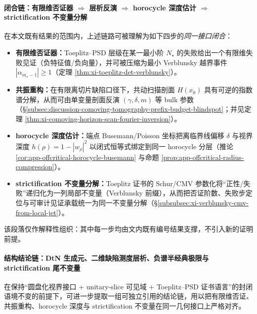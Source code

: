 \paragraph{闭合链：有限维否证器 \texorpdfstring{$\Rightarrow$}{=>} 层析反演 \texorpdfstring{$\Rightarrow$}{=>} horocycle 深度估计 \texorpdfstring{$\Rightarrow$}{=>} strictification 不变量分解}
在本文既有结果的范围内，上述链路可被理解为如下四步的\emph{同一接口闭合}：
\begin{itemize}
  \item \textbf{有限维否证器：}Toeplitz--PSD 层级在某一最小阶 \(N_\star\) 的失败给出一个有限维失败见证（负特征值/负向量），并可被压缩为最小 Verblunsky 越界事件 \(|\alpha_{m_\star-1}|\ge 1\)（定理 \ref{thm:xi-toeplitz-det-verblunsky}）。
  \item \textbf{共振重构：}在有限离切片缺陷口径下，共动扫描剖面 \(H(x_0)\) 具有可逆的指数谱分解，从而可由单变量剖面反演 \((\gamma,\delta,m)\) 等 bulk 参数（\S\ref{subsec:discussion-comoving-tomography-prefix-budget-blindspot}；并见定理 \ref{thm:xi-comoving-horizon-scan-fourier-inversion}）。
  \item \textbf{horocycle 深度估计：}端点 Busemann/Poisson 坐标把离临界线偏移 \(\delta\) 与视界深度 \(h(\rho)=1-|w_\rho|^2\) 以闭式恒等式绑定到同一 horocycle 分层（推论 \ref{cor:app-offcritical-horocycle-busemann} 与命题 \ref{prop:app-offcritical-radius-compression}）。
  \item \textbf{strictification 不变量分解：}Toeplitz 证书的 Schur/CMV 参数化将“正性/失败”递归化为一列局部不变量（Verblunsky 前缀），从而把否证阶数、失败步定位与可审计见证承载统一为同一不变量分解（\S\ref{subsubsec:xi-verblunsky-cmv-from-local-jet}）。
\end{itemize}
该段落仅作解释性组织：其中每一步均由文内既有编号结果支撑，不引入新的证明前提。
\par

\paragraph{结构结论链：DtN 生成元、二维缺陷测度层析、负谱半经典极限与 strictification 尾不变量}
在保持“圆盘化视界接口 + unitary-slice 可见域 + Toeplitz--PSD 证书语言”的封闭语境不变的前提下，可进一步提取一组可独立引用的结论链，用以把有限维否证、共振重构、horocycle 深度与 strictification 不变量在同一几何接口上严格对齐。

